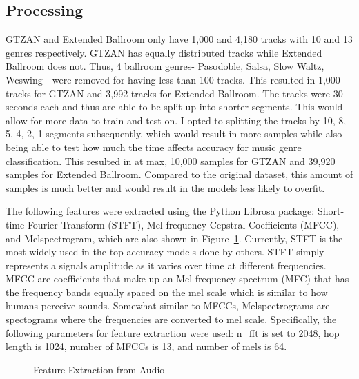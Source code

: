 \documentclass[10pt,twocolumn,letterpaper]{article}
\begin{document}
	\subsection{Processing} %
	
	GTZAN and Extended Ballroom only have 1,000 and 4,180 tracks with 10 and 13 genres respectively. GTZAN has equally distributed tracks while Extended Ballroom does not. Thus, 4 ballroom genres- Pasodoble, Salsa, Slow Waltz, Wcswing - were removed for having less than 100 tracks. This resulted in 1,000 tracks for GTZAN and 3,992 tracks for Extended Ballroom. The tracks were 30 seconds each and thus are able to be split up into shorter segments. This would allow for more data to train and test on. I opted to splitting the tracks by 10, 8, 5, 4, 2, 1 segments subsequently, which would result in more samples while also being able to test how much the time affects accuracy for music genre classification. This resulted in at max, 10,000 samples for GTZAN and 39,920 samples for Extended Ballroom. Compared to the original dataset, this amount of samples is much better and would result in the models less likely to overfit.
	
	The following features were extracted using the Python Librosa package: Short-time Fourier Transform (STFT), Mel-frequency Cepstral Coefficients (MFCC), and Melspectrogram, which are also shown in Figure~\ref{fig:features}. Currently, STFT is the most widely used in the top accuracy models done by others. STFT simply represents a signals amplitude as it varies over time at different frequencies. MFCC are coefficients that make up an Mel-frequency spectrum (MFC) that has the frequency bands equally spaced on the mel scale which is similar to how humans perceive sounds. Somewhat similar to MFCCs, Melspectrograms are spectograms where the frequencies are converted to mel scale. Specifically, the following parameters for feature extraction were used: n\_fft is set to 2048, hop length is 1024, number of MFCCs is 13, and number of mels is 64.
	
	\begin{figure}[!htpb]
		\centering
		\qquad
		
		\caption{Feature Extraction from Audio}
		\label{fig:features}
	\end{figure}
	
\end{document}
